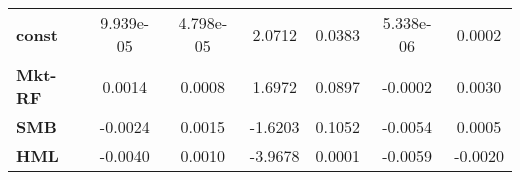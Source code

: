 \begin{center}
\begin{tabular}{lcccccc}
\midrule
\textbf{const}  &     9.939e-05      &     4.798e-05      &      2.0712     &      0.0383      &     5.338e-06     &       0.0002       \\
\textbf{Mkt-RF} &       0.0014       &       0.0008       &      1.6972     &      0.0897      &      -0.0002      &       0.0030       \\
\textbf{SMB}    &      -0.0024       &       0.0015       &     -1.6203     &      0.1052      &      -0.0054      &       0.0005       \\
\textbf{HML}    &      -0.0040       &       0.0010       &     -3.9678     &      0.0001      &      -0.0059      &      -0.0020       \\
\bottomrule
\end{tabular}
\end{center}
